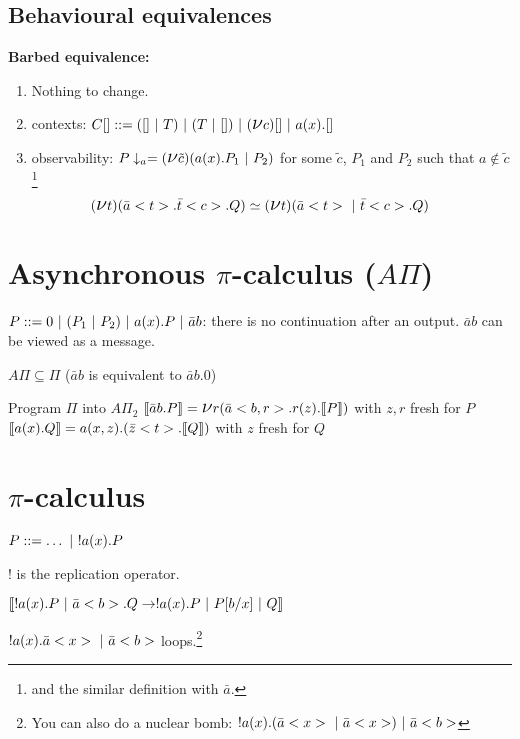 \subsection{Behavioural equivalences}

\textbf{Barbed equivalence:}
\begin{enumerate}
	\item Nothing to change.
	\item contexts: $C[] ::= ([]\ |\  T)\ |\  (T\ |\  []) \ |\  (\mbox{\Large $\nu $} c)[]\ |\  a(x).[]$
	\item observability: $P\downarrow_a = (\mbox{\Large $\nu $} \tilde c)(a(x).P_1\ |\  P_2)$
for some $\tilde c$, $P_1$ and $P_2$ such that $a\not\in \tilde c$\footnote{and the similar definition with $\bar a$.}
\end{enumerate}

\begin{prop}
	$$(\mbox{\Large $\nu $} t )(\bar a <t>.\bar t<c>.Q)\simeq (\mbox{\Large $\nu $} t)(\bar a<t> \ |\  \bar t<c>.Q)$$
\end{prop}

\section{Asynchronous $\pi$-calculus ($A\Pi$)}

$P ::= 0 \ |\  (P_1\ |\  P_2)\ |\  a(x).P \ |\  \bar a b$: there is no continuation after an output. $\bar a b$ can be viewed as a message.

\begin{rmk}
	$A\Pi \subseteq \Pi$ ($\bar a b$ is equivalent to $\bar a b.0$)
\end{rmk}

\begin{exo}{Program $\Pi$ into $A\Pi_2$}
	$\llbracket \bar a b.P\rrbracket =  \mbox{\Large $\nu $} r(\bar a<b, r>.r(z).\llbracket P\rrbracket)$
with $z, r$ fresh for $P$
	$\llbracket a(x).Q\rrbracket = a(x, z).(\bar z<t>.\llbracket Q\rrbracket)$
with $z$ fresh for $Q$
\end{exo}

\section{$\pi$-calculus}

$P ::= \dots  \ |\  !a(x).P$

$!$ is the replication operator.

$\llbracket !a(x).P\ |\  \bar a<b>.Q \rightarrow !a(x).P \ |\  P[b/x]\ |\  Q\rrbracket{}$

\begin{ex}
		$!a(x).\bar a<x> \ |\  \bar a<b>$ loops.\footnote{You can also do a nuclear bomb: $!a(x).(\bar a <x> \ |\  \bar a<x>)\ |\  \bar a<b>$}
\end{ex}


